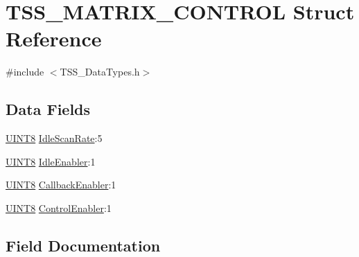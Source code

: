 \hypertarget{struct_t_s_s___m_a_t_r_i_x___c_o_n_t_r_o_l}{}\section{T\+S\+S\+\_\+\+M\+A\+T\+R\+I\+X\+\_\+\+C\+O\+N\+T\+R\+OL Struct Reference}
\label{struct_t_s_s___m_a_t_r_i_x___c_o_n_t_r_o_l}


{\ttfamily \#include $<$T\+S\+S\+\_\+\+Data\+Types.\+h$>$}

\subsection*{Data Fields}
\begin{DoxyCompactItemize}
\item 
\hyperlink{_t_s_s___data_types_8h_ab27e9918b538ce9d8ca692479b375b6a}{U\+I\+N\+T8} \hyperlink{struct_t_s_s___m_a_t_r_i_x___c_o_n_t_r_o_l_a99c7b7e52704391b686df20f28596c3d}{Idle\+Scan\+Rate}\+:5
\item 
\hyperlink{_t_s_s___data_types_8h_ab27e9918b538ce9d8ca692479b375b6a}{U\+I\+N\+T8} \hyperlink{struct_t_s_s___m_a_t_r_i_x___c_o_n_t_r_o_l_aa5bc869699904b94a79c7e91a79e82f4}{Idle\+Enabler}\+:1
\item 
\hyperlink{_t_s_s___data_types_8h_ab27e9918b538ce9d8ca692479b375b6a}{U\+I\+N\+T8} \hyperlink{struct_t_s_s___m_a_t_r_i_x___c_o_n_t_r_o_l_a88735799df711ea15d1e1fefc41a8e89}{Callback\+Enabler}\+:1
\item 
\hyperlink{_t_s_s___data_types_8h_ab27e9918b538ce9d8ca692479b375b6a}{U\+I\+N\+T8} \hyperlink{struct_t_s_s___m_a_t_r_i_x___c_o_n_t_r_o_l_af8b1f79b81dd202b28e3ff059c5be194}{Control\+Enabler}\+:1
\end{DoxyCompactItemize}


\subsection{Field Documentation}
\mbox{\label{struct_t_s_s___m_a_t_r_i_x___c_o_n_t_r_o_l_a88735799df711ea15d1e1fefc41a8e89}} 
